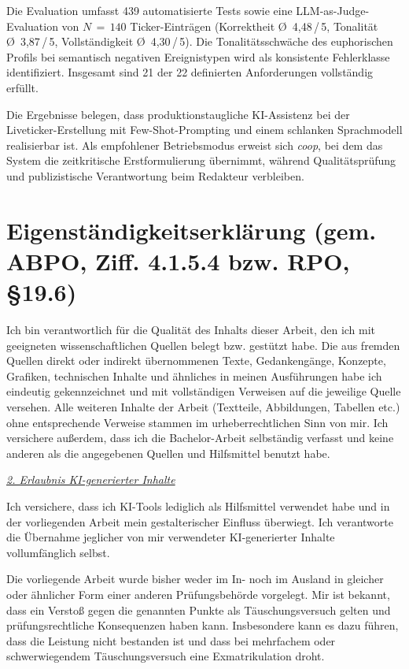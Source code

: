\documentclass[11pt,a4paper,ngerman]{report}
\begin{document}
Die Evaluation umfasst 439 automatisierte Tests sowie eine LLM-as-Judge-Evaluation von $N\,=\,140$ Ticker-Einträgen (Korrektheit Ø~4{,}48\,/\,5, Tonalität Ø~3{,}87\,/\,5, Vollständigkeit Ø~4{,}30\,/\,5). Die Tonalitätsschwäche des euphorischen Profils bei semantisch negativen Ereignistypen wird als konsistente Fehlerklasse identifiziert. Insgesamt sind 21 der 22 definierten Anforderungen vollständig erfüllt.

Die Ergebnisse belegen, dass produktionstaugliche KI-Assistenz bei der Liveticker-Erstellung mit Few-Shot-Prompting und einem schlanken Sprachmodell realisierbar ist. Als empfohlener Betriebsmodus erweist sich \textit{coop}, bei dem das System die zeitkritische Erstformulierung übernimmt, während Qualitätsprüfung und publizistische Verantwortung beim Redakteur verbleiben.

\chapter*{Eigenständigkeitserklärung (gem. ABPO, Ziff. 4.1.5.4 bzw. RPO, §19.6)}

Ich bin verantwortlich für die Qualität des Inhalts dieser Arbeit, den ich mit geeigneten wissenschaftlichen Quellen belegt bzw. gestützt habe. Die aus fremden Quellen direkt oder indirekt übernommenen Texte, Gedankengänge, Konzepte, Grafiken, technischen Inhalte und ähnliches in meinen Ausführungen habe ich eindeutig gekennzeichnet und mit vollständigen Verweisen auf die jeweilige Quelle versehen. Alle weiteren Inhalte der Arbeit (Textteile, Abbildungen, Tabellen etc.) ohne entsprechende Verweise stammen im urheberrechtlichen Sinn von mir. Ich versichere außerdem, dass ich die Bachelor-Arbeit selbständig verfasst und keine anderen als die angegebenen Quellen und Hilfsmittel benutzt habe.

\noindent\underline{\textit{2. Erlaubnis KI-generierter Inhalte}}

\noindent Ich versichere, dass ich KI-Tools lediglich als Hilfsmittel verwendet habe und in der vorliegenden Arbeit mein gestalterischer Einfluss überwiegt. Ich verantworte die Übernahme jeglicher von mir verwendeter KI-generierter Inhalte vollumfänglich selbst.

Die vorliegende Arbeit wurde bisher weder im In- noch im Ausland in gleicher oder ähnlicher Form einer anderen Prüfungsbehörde vorgelegt. Mir ist bekannt, dass ein Verstoß gegen die genannten Punkte als Täuschungsversuch gelten und prüfungsrechtliche Konsequenzen haben kann. Insbesondere kann es dazu führen, dass die Leistung nicht bestanden ist und dass bei mehrfachem oder schwerwiegendem Täuschungsversuch eine Exmatrikulation droht.
\end{document}
